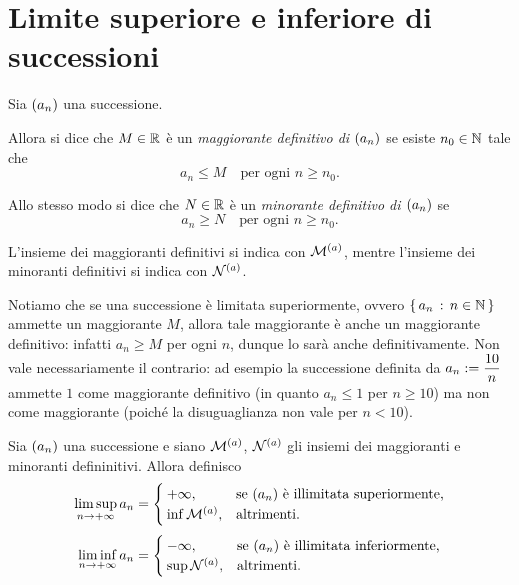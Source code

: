 \section{Limite superiore e inferiore di successioni}

\begin{definition}
     \label{def:magg_min_def}
    Sia $\seqn*{a}$ una successione. 
    
    Allora si dice che $M \in \mathbb{R}$ è un \emph{maggiorante definitivo di $\seqn*{a}$} se esiste $n_0 \in \mathbb{N}$ tale che \begin{equation}
        \label{eq:magg_def} a_n \leq M \quad \text{per ogni } n \geq n_0.
    \end{equation}

    Allo stesso modo si dice che $N \in \mathbb{R}$ è un \emph{minorante definitivo di $\seqn*{a}$} se \begin{equation}
        \label{eq:min_def} a_n \geq N \quad \text{per ogni } n \geq n_0.
    \end{equation}

    L'insieme dei maggioranti definitivi si indica con $\mathcal{M}^{(a)}$, mentre l'insieme dei minoranti definitivi si indica con $\mathcal{N}^{(a)}$.
\end{definition}

Notiamo che se una successione è limitata superiormente, ovvero $\left\{\,a_n \,:\, n \in \mathbb{N}\,\right\}$ ammette un maggiorante $M$, allora tale maggiorante è anche un maggiorante definitivo: infatti $a_n \geq M$ per ogni $n$, dunque lo sarà anche definitivamente.
Non vale necessariamente il contrario: ad esempio la successione definita da $a_n := \dfrac{10}{n}$ ammette $1$ come maggiorante definitivo (in quanto $a_n \leq 1$ per $n \geq 10$) ma non come maggiorante (poiché la disuguaglianza non vale per $n < 10$).

\begin{definition} 
    Sia $\seqn*{a}$ una successione e siano $\mathcal{M}^{(a)}$, $\mathcal{N}^{(a)}$ gli insiemi dei maggioranti e minoranti defininitivi. Allora definisco \begin{equation}
        \label{def:lim_sup} \limsup_{n \to +\infty} a_n = \begin{cases}
            +\infty, &\text{se $\seqn*{a}$ è illimitata superiormente,}\\
            \inf \defUppBound a, &\text{altrimenti.}
        \end{cases}
    \end{equation}\begin{equation}
        \label{def:lim_inf} \liminf_{n \to +\infty} a_n = \begin{cases}
            -\infty, &\text{se $\seqn*{a}$ è illimitata inferiormente,}\\
            \sup \defLowBound a, &\text{altrimenti.}
        \end{cases}
    \end{equation}
\end{definition}


